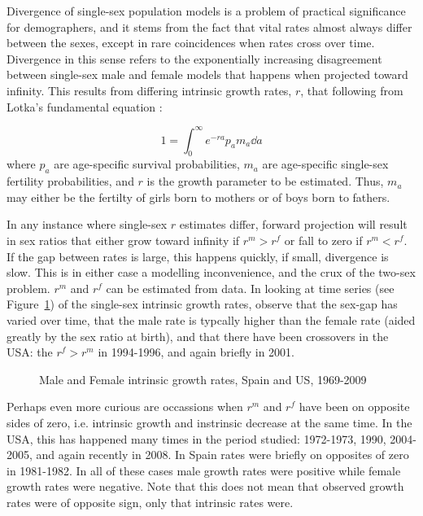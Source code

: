 
Divergence of single-sex population models is a problem of practical
significance for demographers, and it stems from the fact that vital rates almost always
differ between the sexes, except in rare coincidences when rates cross over
time. Divergence in this sense refers to the exponentially increasing
disagreement between single-sex male and female models that happens when
projected toward infinity. This results from differing intrinsic growth rates,
$r$, that following from Lotka's fundamental equation \citep{sharpe1911problem}:

\begin{equation}
1 = \int _0 ^\infty e^{-ra}p_a m_a \dd a 
\end{equation}
where $p_a$ are age-specific survival probabilities, $m_a$ are age-specific
single-sex fertility probabilities, and $r$ is the growth parameter to be
estimated. Thus, $m_a$ may either be the fertilty of girls born to mothers or of
boys born to fathers.

In any instance where single-sex $r$ estimates differ, forward projection
will result in sex ratios that either grow toward infinity if $r^m > r^f$ or
fall to zero if $r^m < r^f$. If the gap between rates is large, this happens
quickly, if small, divergence is slow. This is in either case a modelling
inconvenience, and the crux of the two-sex problem. $r^m$ and $r^f$ can be
estimated from data. In looking at time series (see Figure~\ref{fig:rmf}) of the
single-sex intrinsic growth rates, observe that the sex-gap has varied over
time, that the male rate is typcally higher than the female rate (aided
greatly by the sex ratio at birth), and that there have been crossovers in the
USA: the $r^f > r^m$ in 1994-1996, and again briefly in 2001. 

\begin{figure}[ht!]
        \centering  
          \caption{Male and Female intrinsic growth rates, Spain and US,
          1969-2009}
          \label{fig:rmf}
\end{figure}

Perhaps even more curious are occassions when $r^m$ and $r^f$ have been on
opposite sides of zero, i.e. intrinsic growth and instrinsic decrease at the
same time. In the USA, this has happened many times in the period studied:
1972-1973, 1990, 2004-2005, and again recently in 2008. In Spain rates were 
briefly on opposites of zero in 1981-1982. In all of these cases male growth
rates were positive while female growth rates were negative. Note that this does
not mean that observed growth rates were of opposite sign, only that intrinsic
rates were. 

